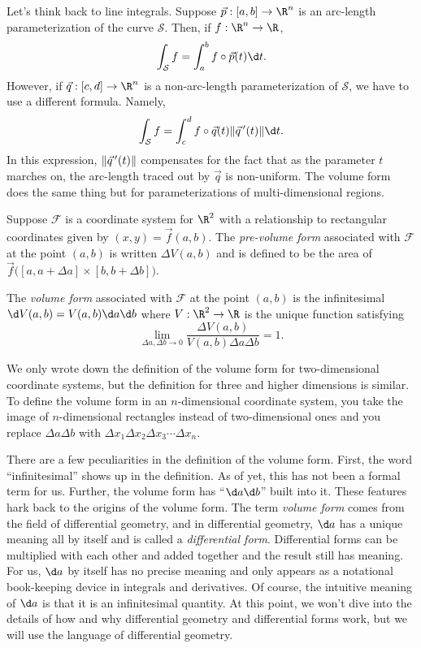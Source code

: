 Let's think back to line integrals.  Suppose $\vec p:[a,b]\to\R^n$ is an
arc-length parameterization
of the curve $\mathcal S$. Then, if $f:\R^n\to\R$,
\[
	\int_{\mathcal S} f = \int_{a}^b f\circ \vec p(t) \d t.
\]
However, if $\vec q:[c,d]\to\R^n$ is a non-arc-length parameterization of $\mathcal S$, we have to
use a different formula.  Namely,
\[
	\int_{\mathcal S} f = \int_{c}^d f\circ \vec q(t)\norm{\vec q\,'(t)} \d t.
\]
In this expression, $\lVert\vec q\,'(t)\rVert$ compensates for the fact that as the parameter
$t$ marches on, the arc-length traced out by $\vec q$ is non-uniform.  The volume form does
the same thing but for parameterizations of multi-dimensional regions.


\begin{definition}
	Suppose $\mathcal F$ is a coordinate system for $\R^2$ with a relationship
	to rectangular coordinates given by $(x,y)=\vec f(a,b)$.
	The \emph{pre-volume form} associated with $\mathcal F$ at the point $(a,b)$
	is written $\Delta V(a,b)$ and is defined to be the area of
	$\vec f\big([a,a+\Delta a]\times [b,b+\Delta b]\big)$.
	
	The \emph{volume form} associated with $\mathcal F$ at the point $(a,b)$
	is the infinitesimal $\d V(a,b)=V(a,b)\d a\d b$ where $V:\R^2\to\R$ is the 
	unique function satisfying
	\[
		\lim_{\Delta a,\Delta b\to 0} \frac{\Delta V(a,b)}{V(a,b)\Delta a\Delta b}=1.
	\]
\end{definition}
We only wrote down the definition of the volume form for two-dimensional coordinate systems,
but the definition for three and higher dimensions is similar.  To define the
volume form in an $n$-dimensional coordinate system, you take the image
of $n$-dimensional rectangles instead of two-dimensional ones and you replace $\Delta a\Delta b$
with $\Delta x_1\Delta x_2\Delta x_3\cdots\Delta x_n$.

There are a few peculiarities in the definition of the volume form.
First, the word ``infinitesimal'' shows up in the definition.  As of yet,
this has not been a formal term for us.  Further, the volume form has
``$\d a\d b$'' built into it.  These features hark back to the origins
of the volume form.  The term \emph{volume form}
comes from the field of differential geometry, and in differential geometry,
$\d a$ has a unique meaning all by itself and is called a \emph{differential form}.  
Differential forms can be multiplied with each other and added together and the
result still has meaning.
For
us, $\d a$  by itself has no precise
meaning and only appears as a notational book-keeping device in integrals and derivatives.
Of course, the intuitive meaning of $\d a$ is that it is an infinitesimal quantity.
At this point, we won't dive into the details of how and why differential geometry and differential forms
work, but we
will use the language of differential geometry.

